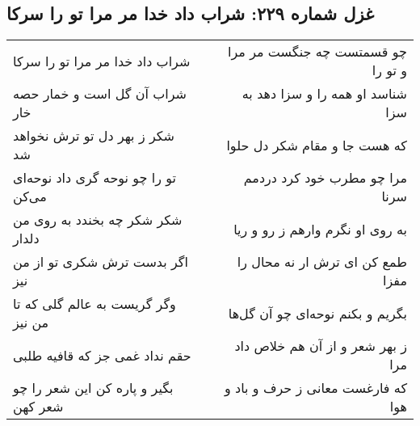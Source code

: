 \begin{center}
\section*{غزل شماره ۲۲۹: شراب داد خدا مر مرا تو را سرکا}
\label{sec:0229}
\begin{longtable}{l p{0.5cm} r}
شراب داد خدا مر مرا تو را سرکا
&&
چو قسمتست چه جنگست مر مرا و تو را
\\
شراب آن گل است و خمار حصه خار
&&
شناسد او همه را و سزا دهد به سزا
\\
شکر ز بهر دل تو ترش نخواهد شد
&&
که هست جا و مقام شکر دل حلوا
\\
تو را چو نوحه گری داد نوحه‌ای می‌کن
&&
مرا چو مطرب خود کرد دردمم سرنا
\\
شکر شکر چه بخندد به روی من دلدار
&&
به روی او نگرم وارهم ز رو و ریا
\\
اگر بدست ترش شکری تو از من نیز
&&
طمع کن ای ترش ار نه محال را مفزا
\\
وگر گریست به عالم گلی که تا من نیز
&&
بگریم و بکنم نوحه‌ای چو آن گل‌ها
\\
حقم نداد غمی جز که قافیه طلبی
&&
ز بهر شعر و از آن هم خلاص داد مرا
\\
بگیر و پاره کن این شعر را چو شعر کهن
&&
که فارغست معانی ز حرف و باد و هوا
\\
\end{longtable}
\end{center}

